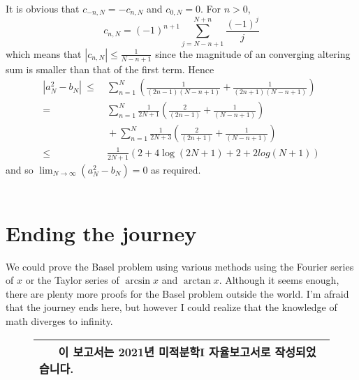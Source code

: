 It is obvious that $c_{-n,N}=-c_{n,N}$ and $c_{0,N}=0$. For $n > 0$,
\[
    c_{n,N}=(-1)^{n+1}\sum_{j=N-n+1}^{N+n}\frac{(-1)^j}{j}
\]
which means that $|c_{n,N}| \leq \frac{1}{N-n+1}$ since the magnitude of an converging altering sum is smaller than that of the first term. Hence
\begin{equation}
\begin{split}
|a_N^2-b_N| ~\leq{}& ~\sum_{n=1}^N(\frac{1}{(2n-1)(N-n+1)} + \frac{1}{(2n+1)(N-n+1)})\\
={}& ~\sum_{n=1}^N\frac{1}{2N+1}(\frac{2}{(2n-1)} + \frac{1}{(N-n+1)})\\
{}& ~+ \sum_{n=1}^N\frac{1}{2N+3}(\frac{2}{(2n+1)} + \frac{1}{(N-n+1)})\\
\leq{}& ~\frac{1}{2N+1}(2+4\log(2N+1)+2+2log(N+1)) \nonumber
\end{split}
\end{equation}
and so $\lim_{N\rightarrow\infty}(a_N^2-b_N)=0$ as required.~\\\\

\section*{Ending the journey}
We could prove the Basel problem using various methods using the Fourier series of $x$ or the Taylor series of $\arcsin x$ and $\arctan x$. Although it seems enough, there are plenty more proofs for the Basel problem outside the world. I'm afraid that the journey ends here, but however I could realize that the knowledge of math diverges to infinity.~\\


\vspace{4.5cm}
\begin{figure}[H]
\begin{table}[H]
\begin{center}
\begin{tabular}{l}
\hline
\textbf{~~~이 보고서는 2021년 미적분학I 자율보고서로 작성되었습니다.~~~}\\
\hline
\end{tabular}
\end{center}
\end{table}
\end{figure}